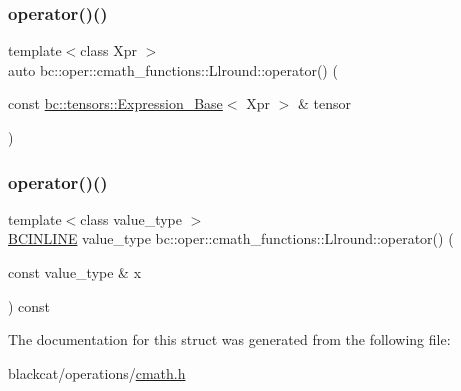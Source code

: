 \mbox{\label{structbc_1_1oper_1_1cmath__functions_1_1Llround_aa39036776459f067146e04ad71159cb1}} 
\subsubsection{\texorpdfstring{operator()()}{operator()()}\hspace{0.1cm}{\footnotesize\ttfamily [2/3]}}
{\footnotesize\ttfamily template$<$class Xpr $>$ \\
auto bc\+::oper\+::cmath\+\_\+functions\+::\+Llround\+::operator() (\begin{DoxyParamCaption}\item[{const \hyperlink{classbc_1_1tensors_1_1Expression__Base}{bc\+::tensors\+::\+Expression\+\_\+\+Base}$<$ Xpr $>$ \&}]{tensor }\end{DoxyParamCaption})\hspace{0.3cm}{\ttfamily [inline]}}

\mbox{\label{structbc_1_1oper_1_1cmath__functions_1_1Llround_ac483a61af1b65a6269fae307d5760963}} 
\subsubsection{\texorpdfstring{operator()()}{operator()()}\hspace{0.1cm}{\footnotesize\ttfamily [3/3]}}
{\footnotesize\ttfamily template$<$class value\+\_\+type $>$ \\
\hyperlink{common_8h_a6699e8b0449da5c0fafb878e59c1d4b1}{B\+C\+I\+N\+L\+I\+NE} value\+\_\+type bc\+::oper\+::cmath\+\_\+functions\+::\+Llround\+::operator() (\begin{DoxyParamCaption}\item[{const value\+\_\+type \&}]{x }\end{DoxyParamCaption}) const\hspace{0.3cm}{\ttfamily [inline]}}



The documentation for this struct was generated from the following file\+:\begin{DoxyCompactItemize}
\item 
blackcat/operations/\hyperlink{cmath_8h}{cmath.\+h}\end{DoxyCompactItemize}
